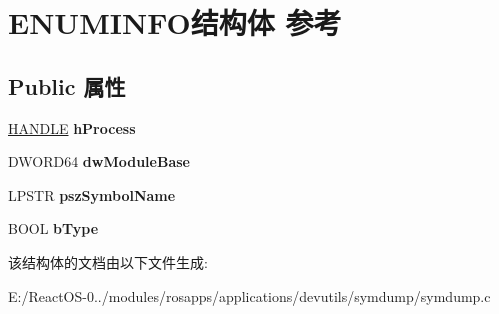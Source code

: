 \hypertarget{struct_e_n_u_m_i_n_f_o}{}\section{E\+N\+U\+M\+I\+N\+F\+O结构体 参考}
\label{struct_e_n_u_m_i_n_f_o}
\subsection*{Public 属性}
\begin{DoxyCompactItemize}
\item 
\mbox{\label{struct_e_n_u_m_i_n_f_o_a5999c1f41fe6c5a31e19d7f43caa575b}} 
\hyperlink{interfacevoid}{H\+A\+N\+D\+LE} {\bfseries h\+Process}
\item 
\mbox{\label{struct_e_n_u_m_i_n_f_o_a9897aec0f45f2450e585b76bb440f661}} 
D\+W\+O\+R\+D64 {\bfseries dw\+Module\+Base}
\item 
\mbox{\label{struct_e_n_u_m_i_n_f_o_a7fdc88a9bb49b12cb05e66687b9633dd}} 
L\+P\+S\+TR {\bfseries psz\+Symbol\+Name}
\item 
\mbox{\label{struct_e_n_u_m_i_n_f_o_a9f825f13d2994f3d80f9a5e958dae6c0}} 
B\+O\+OL {\bfseries b\+Type}
\end{DoxyCompactItemize}


该结构体的文档由以下文件生成\+:\begin{DoxyCompactItemize}
\item 
E\+:/\+React\+O\+S-\/0../modules/rosapps/applications/devutils/symdump/symdump.\+c\end{DoxyCompactItemize}
